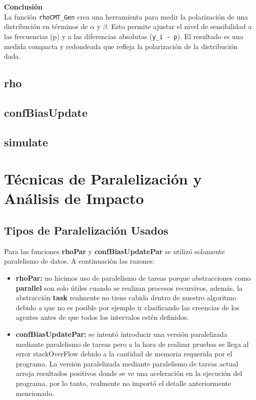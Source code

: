 \documentclass{article}
\begin{document}
	\textbf{Conclusión}\\

	La función \texttt{rhoCMT\_Gen} crea una herramienta para medir la polarización de una distribución en términos de $\alpha$ y $\beta$. Esto permite ajustar el nivel de sensibilidad a las frecuencias (p) y a las diferencias absolutas (\texttt{y\_i - p}). El resultado es una medida compacta y redondeada que refleja la polarización de la distribución dada.


    \subsection{rho}

    \subsection{confBiasUpdate}

    \subsection{simulate}

  \section{Técnicas de Paralelización y Análisis de Impacto}

    \subsection{Tipos de Paralelización Usados}
    Para las funciones \textbf{rhoPar} y \textbf{confBiasUpdatePar} se utilizó solamente paralelismo de datos. A continuación  las razones:

    \begin{itemize}
      \item \textbf{rhoPar:} no hicimos uso de paralelismo de tareas porque abstracciones como \textbf{parallel} son solo útiles cuando se realizan procesos recursivos, además, la abstracción \textbf{task} realmente no tiene cabida dentro de nuestro algoritmo debido a que no es posible por ejemplo ir clasificando las creencias de los agentes antes de que todos los intervalos estén definidos.
      \item \textbf{confBiasUpdatePar:} se intentó introducir una versión paralelizada mediante paralelismo de tareas pero a la hora de realizar pruebas se llega al error stackOverFlow debido a la cantidad de memoria requerida por el programa. La versión paralelizada mediante paralelismo de tareas actual arroja resultados positivos donde se ve una aceleración en la ejecución del programa, por lo tanto, realmente no importó el detalle anteriormente mencionado.
    \end{itemize}
\end{document}
